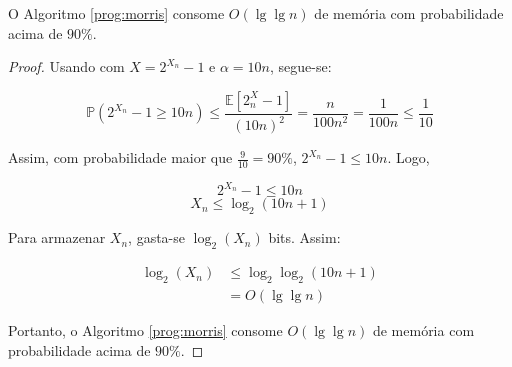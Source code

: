 \begin{lemma}
  O Algoritmo \ref{prog:morris} consome $O(\lg \lg n)$ de memória com probabilidade acima de $90\%$.
\end{lemma}

\begin{proof}
  Usando  com $X = 2^{X_n} - 1$ e $\alpha = 10n$, segue-se:

\[ \mathbb{P}(2^{X_n} - 1 \geq 10n)  \leq \frac{\mathbb{E}[2^X_n - 1]}{(10n)^2} = \frac{n}{100n^2} = \frac{1}{100n} \leq \frac{1}{10} \]

Assim, com probabilidade maior que $\frac{9}{10} = 90\%$, $2^{X_n} - 1 \leq 10n$. Logo, 

\[ 2^{X_n} - 1 \leq 10n  \]
\[ X_n \leq \log_2(10n + 1)\]

Para armazenar $X_n$, gasta-se $\log_2(X_n)$ bits. Assim:

\begin{align*}
  \log_2(X_n) 
    &\leq \log_2\log_2(10n + 1) \\ 
    &= O(\lg \lg n)
\end{align*} 

Portanto, o Algoritmo \ref{prog:morris} consome $O(\lg \lg n)$ de memória com probabilidade acima de $90\%$.

\end{proof}

